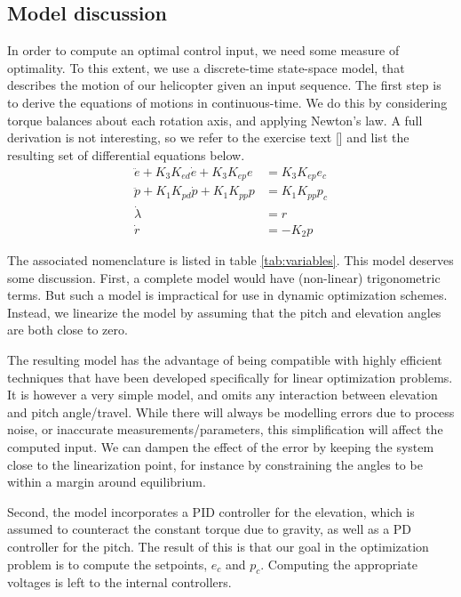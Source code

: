 \subsection{Model discussion}
In order to compute an optimal control input, we need some measure of optimality.
To this extent, we use a discrete-time state-space model, that describes the motion
of our helicopter given an input sequence. The first step is to derive the equations
of motions in continuous-time. We do this by considering torque balances about each
rotation axis, and applying Newton's law. A full derivation is not interesting, so
we refer to the exercise text [\cite{LabExercise}] and list the resulting set of
differential equations below.
\begin{subequations}
\label{eq:model_al}
\begin{align}
    \ddot{e} + K_{3} K_{ed} \dot{e} + K_{3} K_{ep} e &= K_{3} K_{ep} e_{c} \label{eq:model_se_al_elev} \\
    \ddot{p} + K_{1} K_{pd} \dot{p} + K_{1} K_{pp} p &= K_{1} K_{pp} p_{c} \label{eq:model_se_al_pitch} \\
    \dot{\lambda} &= r \label{eq:model_se_al_lambda} \\
    \dot{r} &= -K_{2} p \label{eq:model_se_al_r}
\end{align}
\end{subequations}

The associated nomenclature is listed in table \ref{tab:variables}. This model deserves some discussion. First, a complete model would have (non-linear) trigonometric terms. But such a model is impractical for use in dynamic optimization schemes. Instead, we linearize the model by assuming that the pitch and elevation angles are both close to zero.

The resulting model has the advantage of being compatible with highly efficient techniques that have been developed specifically for linear optimization problems. It is however a very simple model, and omits any interaction between elevation and pitch angle/travel. While there will always be modelling errors due to process noise, or inaccurate measurements/parameters, this simplification will affect the computed input. We can dampen the effect of the error by keeping the system close to the linearization point, for instance by constraining the angles to be within a margin around equilibrium.

Second, the model incorporates a PID controller for the elevation, which is assumed to counteract the constant torque due to gravity, as well as a PD controller for the pitch. The result of this is that our goal in the optimization problem is to compute the setpoints, $e_c$ and $p_c$. Computing the appropriate voltages is left to the internal controllers.

